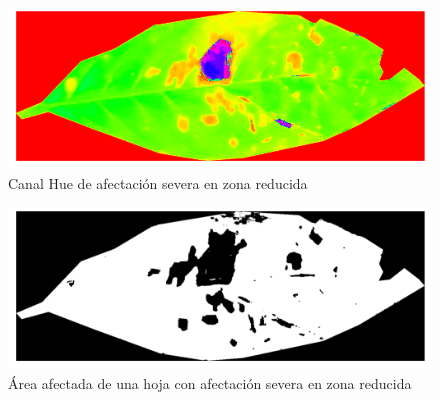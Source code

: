\begin{enumerate}
\begin{figure}[H]
\centering
\includegraphics[scale=1]{images/consideration_severity_hue.png}
\caption{Canal Hue de afectación severa en zona reducida}
\label{img:issue_severity_hue}
\end{figure}

\begin{figure}[H]
\centering
\includegraphics[scale=1]{images/consideration_severity_binary.png}
\caption{Área afectada de una hoja con afectación severa en zona reducida}
\label{img:issue_severity_binary}
\end{figure}

\end{enumerate}
